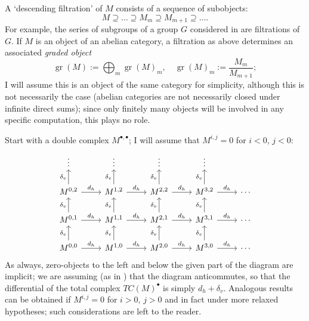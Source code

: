 A `descending filtration' of $M$ consists of a sequence of subobjects:
\[
  M \supseteq \dots \supseteq M_m \supseteq M_{m+1} \supseteq \dots.
\]
For example, the series of subgroups of a group $G$ considered in
 are filtrations of
$G$. If $M$ is an object of an abelian category, a filtration as above
determines an associated \emph{graded object}
\[
  \operatorname{gr}(M) := \bigoplus_m \operatorname{gr}(M)_m, \quad
  \operatorname{gr}(M)_m := \frac{M_m}{M_{m+1}};
\]
I will assume this is an object of the same category for simplicity,
although this is not necessarily the case (abelian categories are not
necessarily closed under infinite direct sums); since only finitely
many objects will be involved in any specific computation, this plays
no role.

Start with a double complex $M^{\bullet,\bullet}$; I will assume that
$M^{i,j} = 0$ for $i < 0$, $j < 0$:
\[\begin{tikzcd}
    \vdots & \vdots & \vdots & \vdots & \\
    M^{0,2} \arrow[r,"d_h"] \arrow[u,"\delta_v"] & M^{1,2} \arrow[r,"d_h"] \arrow[u,"\delta_v"] & M^{2,2} \arrow[r,"d_h"] \arrow[u,"\delta_v"] & M^{3,2} \arrow[r,"d_h"] \arrow[u,"\delta_v"] & \cdots \\
    M^{0,1} \arrow[r,"d_h"] \arrow[u,"\delta_v"] & M^{1,1} \arrow[r,"d_h"] \arrow[u,"\delta_v"] & M^{2,1} \arrow[r,"d_h"] \arrow[u,"\delta_v"] & M^{3,1} \arrow[r,"d_h"] \arrow[u,"\delta_v"] & \cdots \\
    M^{0,0} \arrow[r,"d_h"] \arrow[u,"\delta_v"] & M^{1,0}
    \arrow[r,"d_h"] \arrow[u,"\delta_v"] & M^{2,0} \arrow[r,"d_h"]
    \arrow[u,"\delta_v"] & M^{3,0} \arrow[r,"d_h"]
    \arrow[u,"\delta_v"] & \cdots
  \end{tikzcd}\] As always, zero-objects to the left and below the
given part of the diagram are implicit; we are assuming (as in
) that the diagram anticommutes, so that the
differential of the total complex $TC(M)^\bullet$ is simply
$d_h + \delta_v$. Analogous results can be obtained if $M^{i,j} = 0$
for $i > 0$, $j > 0$ and in fact under more relaxed hypotheses; such
considerations are left to the reader.

